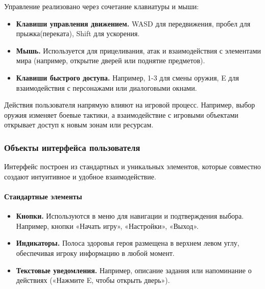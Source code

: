 \documentclass[12pt]{article}
\begin{document}
        Управление реализовано через сочетание клавиатуры и мыши: 
        \begin{itemize}
            \item \textbf{Клавиши управления движением.} WASD для передвижения, пробел для прыжка(переката), Shift для ускорения.  
            \item \textbf{Мышь.} Используется для прицеливания, атак и взаимодействия с элементами мира (например, открытие дверей или поднятие предметов).  
            \item \textbf{Клавиши быстрого доступа.} Например, 1-3 для смены оружия, E для взаимодействия с персонажами или диалоговыми окнами.  
        \end{itemize}
        
        Действия пользователя напрямую влияют на игровой процесс. Например, выбор оружия изменяет боевые тактики, а взаимодействие с игровыми объектами открывает доступ к новым зонам или ресурсам.
        
        \subsubsection{Объекты интерфейса пользователя}
        Интерфейс построен из стандартных и уникальных элементов, которые совместно создают интуитивное и удобное взаимодействие.
        
        \paragraph{Стандартные элементы}
        \begin{itemize}
            \item \textbf{Кнопки.} Используются в меню для навигации и подтверждения выбора. Например, кнопки «Начать игру», «Настройки», «Выход».  
            \item \textbf{Индикаторы.} Полоса здоровья героя размещена в верхнем левом углу, обеспечивая игроку информацию в любой момент.  
            \item \textbf{Текстовые уведомления.} Например, описание задания или напоминание о действиях («Нажмите E, чтобы открыть дверь»).  
        \end{itemize}
        
\end{document}

